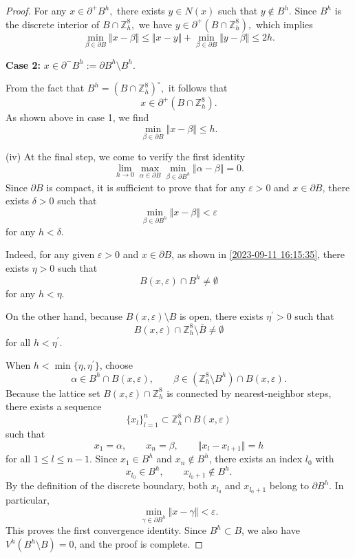 \documentclass{amsart}
\theoremstyle{definition}
\theoremstyle{remark}
\numberwithin{equation}{section}
\newcommand{\p}{\partial}
\newcommand{\Z}{\mathbb Z}
\begin{document}
\begin{proof}
    For any $x\in \p^+ B^h,$ there exists $y\in N(x)$ such that $y\notin B^h$. Since $B^h$ is the discrete interior of $B\cap \Z^8_h,$ we have $y\in \p^+(B\cap \Z^8_h),$ which implies \[
\min_{\beta \in \p B}\Vert x-\beta \Vert \leqslant \Vert x-y\Vert +\min_{\beta\in \p B}\Vert y-\beta \Vert \leqslant 2h.
\]

    \bigskip
   {\bf  Case 2: } $x\in \p^-B^h:=\p B^h\setminus B^h.$

    \bigskip
    From the fact that $B^h=(B\cap \Z^8_h)^\circ,$ it follows that \[
x\in \p^+(B\cap \Z^8_h).
\] As shown above in case 1, we find \[
\min_{\beta\in \p B} \Vert x-\beta \Vert \leqslant h.
\]

    \bigskip

    (iv) At the final step, we come to verify the first identity \[
\lim_{h\to 0} \max_{\alpha\in \p B }\min_{\beta\in \p B^h} \Vert \alpha-\beta\Vert=0.
\] Since $\p B$ is compact, it is sufficient to prove that for any 	 $\varepsilon>0$  and $x \in\p B$, there exists $\delta>0$ such that \[
\min_{\beta \in \p B^h} \Vert x-\beta \Vert < \varepsilon
\] for any $h<\delta.$

    Indeed, for any given 	$\varepsilon>0$ and $x \in \p B$, as shown in \eqref{2023-09-11 16:15:35}, there exists $\eta>0 $ such that \[
B(x,\varepsilon)\cap B^h\neq \emptyset
\] for any $h<\eta.$

    On the other hand, because $B(x,\varepsilon 	)\setminus B$ is open, there exists $\eta^\prime > 0$ such that \[
B(x,\varepsilon)\cap \Z^8_h\setminus \overline B \neq \emptyset
\]
   for all  $h<\eta^\prime$.

    When $h<\min\{\eta,\eta^\prime\}$, choose
    \[
        \alpha \in B^h\cap B(x,\varepsilon), \qquad \beta \in (\Z_h^8\setminus B^h)\cap B(x,\varepsilon).
    \]
    Because the lattice set \(B(x,\varepsilon)\cap \Z_h^8\) is connected by nearest-neighbor steps, there exists a sequence
    \[
        \{x_l\}_{l=1}^n \subset \Z_h^8 \cap B(x,\varepsilon)
    \]
    such that
    \[
        x_1=\alpha,\qquad x_n=\beta,\qquad \Vert x_l-x_{l+1}\Vert=h
    \]
    for all \(1\le l\le n-1\). Since \(x_1\in B^h\) and \(x_n\notin B^h\), there exists an index \(l_0\) with
    \[
        x_{l_0}\in B^h,\qquad x_{l_0+1}\notin B^h.
    \]
    By the definition of the discrete boundary, both \(x_{l_0}\) and \(x_{l_0+1}\) belong to \(\p B^h\). In particular,
    \[
        \min_{\gamma\in \p B^h}\Vert x-\gamma\Vert<\varepsilon.
    \]
    This proves the first convergence identity. Since \(B^h\subset B\), we also have \(V^h(B^h\setminus B)=0\), and the proof is complete.




\end{proof}
\end{document}
